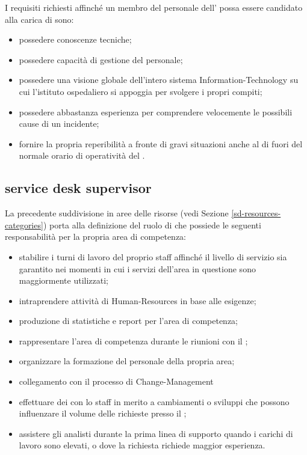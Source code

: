 I requisiti richiesti affinché un membro del personale dell'\entity{} possa essere candidato alla carica di  sono:

\begin{itemize}
\item{possedere conoscenze tecniche;}
\item{possedere capacità di gestione del personale;}
\item{possedere una visione globale dell'intero sistema \acs{Information-Technology} su cui l'istituto ospedaliero si appoggia per svolgere i propri compiti;}
\item{possedere abbastanza esperienza per comprendere velocemente le possibili cause di un incidente;}
\item{fornire la propria reperibilità a fronte di gravi situazioni anche al di fuori del normale orario di operatività del .}
\end{itemize}

\subsection[Service Desk Supervisor]{service desk supervisor}
\label{sd-sd-supervisor}
La precedente suddivisione in aree delle risorse (vedi Sezione \ref{sd-resources-categories}) porta alla definizione del ruolo di  che possiede le seguenti responsabilità per la propria area di competenza:

\begin{itemize}
\item{stabilire i turni di lavoro del proprio staff affinché il livello di servizio sia garantito nei momenti in cui i servizi dell'area in questione sono maggiormente utilizzati;}
\item{intraprendere attività di \ac{Human-Resources} in base alle esigenze;}
\item{produzione di statistiche e report per l'area di competenza;}
\item{rappresentare l'area di competenza durante le riunioni con il ;}
\item{organizzare la formazione del personale della propria area;}
\item{collegamento con il processo di \ac{Change-Management}}
\item{effettuare dei  con lo staff in merito a cambiamenti o sviluppi che possono influenzare il volume delle richieste presso il ;}
\item{assistere gli analisti durante la prima linea di supporto quando i carichi di lavoro sono elevati, o dove la richiesta richiede maggior esperienza.}
\end{itemize}

